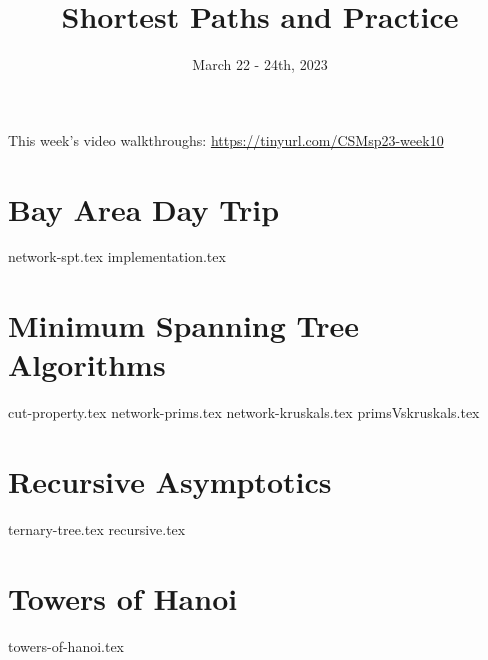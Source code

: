 \documentclass[11pt]{exam}
\title{Shortest Paths and Practice}
\date{March 22 - 24th, 2023}
\begin{document}
\maketitle
This week's video walkthroughs:
\href{https://tinyurl.com/CSMsp23-week10}{https://tinyurl.com/CSMsp23-week10}


\section{Bay Area Day Trip}
\begin{questions}
{network-spt.tex}
{implementation.tex}
\end{questions}


\section{Minimum Spanning Tree Algorithms}
\begin{questions}
{cut-property.tex}
{network-prims.tex}
{network-kruskals.tex}
{primsVskruskals.tex}
\end{questions}

\section{Recursive Asymptotics}
\begin{questions}
{ternary-tree.tex}
{recursive.tex}
\end{questions}

\pagebreak
\section{Towers of Hanoi}
\begin{questions}
{towers-of-hanoi.tex}
\end{questions}
\end{document}
